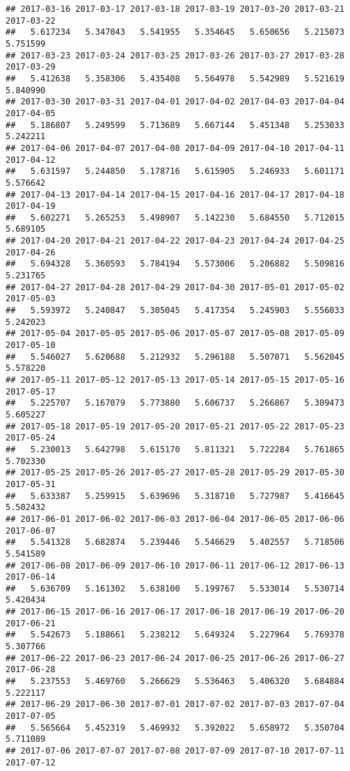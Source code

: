\documentclass[
]{article}
\begin{document}
\begin{verbatim}
## 2017-03-16 2017-03-17 2017-03-18 2017-03-19 2017-03-20 2017-03-21 2017-03-22 
##   5.617234   5.347043   5.541955   5.354645   5.650656   5.215073   5.751599 
## 2017-03-23 2017-03-24 2017-03-25 2017-03-26 2017-03-27 2017-03-28 2017-03-29 
##   5.412638   5.358306   5.435408   5.564978   5.542989   5.521619   5.840990 
## 2017-03-30 2017-03-31 2017-04-01 2017-04-02 2017-04-03 2017-04-04 2017-04-05 
##   5.186807   5.249599   5.713689   5.667144   5.451348   5.253033   5.242211 
## 2017-04-06 2017-04-07 2017-04-08 2017-04-09 2017-04-10 2017-04-11 2017-04-12 
##   5.631597   5.244850   5.178716   5.615905   5.246933   5.601171   5.576642 
## 2017-04-13 2017-04-14 2017-04-15 2017-04-16 2017-04-17 2017-04-18 2017-04-19 
##   5.602271   5.265253   5.498907   5.142230   5.684550   5.712015   5.689105 
## 2017-04-20 2017-04-21 2017-04-22 2017-04-23 2017-04-24 2017-04-25 2017-04-26 
##   5.694328   5.360593   5.784194   5.573006   5.206882   5.509816   5.231765 
## 2017-04-27 2017-04-28 2017-04-29 2017-04-30 2017-05-01 2017-05-02 2017-05-03 
##   5.593972   5.240847   5.305045   5.417354   5.245903   5.556033   5.242023 
## 2017-05-04 2017-05-05 2017-05-06 2017-05-07 2017-05-08 2017-05-09 2017-05-10 
##   5.546027   5.620688   5.212932   5.296188   5.507071   5.562045   5.578220 
## 2017-05-11 2017-05-12 2017-05-13 2017-05-14 2017-05-15 2017-05-16 2017-05-17 
##   5.225707   5.167079   5.773880   5.606737   5.266867   5.309473   5.605227 
## 2017-05-18 2017-05-19 2017-05-20 2017-05-21 2017-05-22 2017-05-23 2017-05-24 
##   5.230013   5.642798   5.615170   5.811321   5.722284   5.761865   5.702330 
## 2017-05-25 2017-05-26 2017-05-27 2017-05-28 2017-05-29 2017-05-30 2017-05-31 
##   5.633387   5.259915   5.639696   5.318710   5.727987   5.416645   5.502432 
## 2017-06-01 2017-06-02 2017-06-03 2017-06-04 2017-06-05 2017-06-06 2017-06-07 
##   5.541328   5.682874   5.239446   5.546629   5.402557   5.718506   5.541589 
## 2017-06-08 2017-06-09 2017-06-10 2017-06-11 2017-06-12 2017-06-13 2017-06-14 
##   5.636709   5.161302   5.638100   5.199767   5.533014   5.530714   5.420434 
## 2017-06-15 2017-06-16 2017-06-17 2017-06-18 2017-06-19 2017-06-20 2017-06-21 
##   5.542673   5.188661   5.238212   5.649324   5.227964   5.769378   5.307766 
## 2017-06-22 2017-06-23 2017-06-24 2017-06-25 2017-06-26 2017-06-27 2017-06-28 
##   5.237553   5.469760   5.266629   5.536463   5.406320   5.684884   5.222117 
## 2017-06-29 2017-06-30 2017-07-01 2017-07-02 2017-07-03 2017-07-04 2017-07-05 
##   5.565664   5.452319   5.469932   5.392022   5.658972   5.350704   5.711089 
## 2017-07-06 2017-07-07 2017-07-08 2017-07-09 2017-07-10 2017-07-11 2017-07-12 

\end{verbatim}
\end{document}
